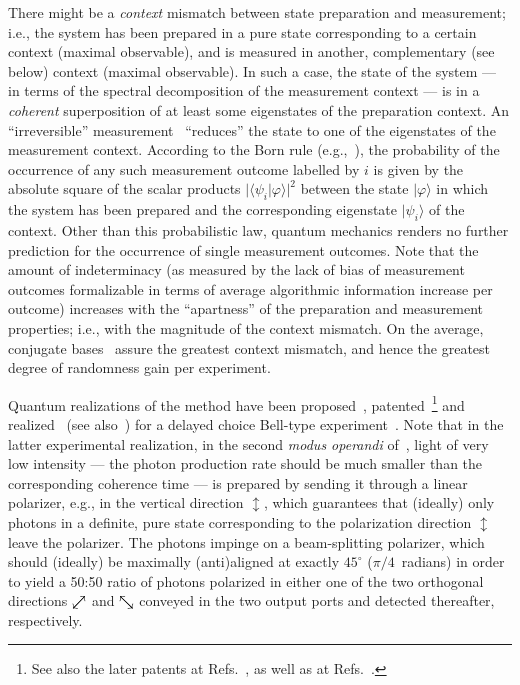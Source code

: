 \documentclass[%
 preprint,
 showpacs,
 showkeys,
 preprintnumbers,
 amsmath,amssymb,
 aps,
 prl,
  longbibliography,
 ]{revtex4-1}
\begin{document}
There might be a {\em context} mismatch between state preparation and measurement;
i.e.,  the system has been prepared in a pure state
corresponding to a certain context (maximal observable),
and is measured in another,  complementary (see below) context
(maximal observable).
In such a case, the state of the system --- in terms of the spectral decomposition
of the measurement context --- is in a {\em coherent} superposition of at least some eigenstates of the preparation context.
An ``irreversible'' measurement~\cite{hkwz,greenberger2} ``reduces'' the state to one of the eigenstates
of the measurement context.
According to the Born rule (e.g.,~\cite[Chapter~1]{mermin-07}),
the probability of the occurrence of any such measurement outcome labelled by $i$
is given by the absolute square of the scalar products
$\vert \langle \psi_i \vert \varphi \rangle \vert^2$
between the state $\vert \varphi \rangle$  in which the system has been prepared
and the corresponding eigenstate $\vert \psi_i \rangle$
of the context.
Other than this probabilistic law, quantum mechanics renders no further prediction for the occurrence of single measurement
outcomes.
Note that the amount of indeterminacy (as measured by the lack of bias of measurement outcomes
formalizable in terms of average algorithmic information increase per outcome)
increases with the ``apartness'' of the preparation and measurement properties;
i.e., with the magnitude of the context mismatch.
On the average, conjugate bases~\cite[p.~86]{wiesner} assure the greatest context mismatch,
and hence the greatest degree of randomness gain per experiment.


Quantum realizations of the method have been proposed~\cite{svozil-qct,rarity-94}, patented~\footnote{
See also the later patents at Refs.~\cite{dultz-98,dultz-99},
as well as at Refs.~\cite{Ribordy-04,Ribordy-06}.}
and realized~\cite[Fig.~1(b)]{zeilinger:qct} (see also~\cite{stefanov-2000})
for a delayed choice Bell-type experiment~\cite{zeilinger-epr-98}.
Note that in the latter experimental realization, in the second {\em modus operandi} of~\cite{zeilinger-epr-98},
light of very low intensity --- the photon production rate should be much smaller than the corresponding coherence time ---
is prepared by sending it through a linear polarizer, e.g., in the vertical direction $\updownarrow$,
which guarantees that (ideally) only photons in a definite,
pure state corresponding to the polarization direction $\updownarrow$ leave the polarizer.
The photons impinge on a beam-splitting polarizer,
which should (ideally) be maximally (anti)aligned at exactly $45^\circ$ ($\pi/4$~radians) in order to yield a 50:50 ratio of photons
polarized in either one of the two orthogonal directions $\swarrow\mkern-18mu\nearrow$
and $\searrow\mkern-18mu\nwarrow$ conveyed
in the two output ports and detected thereafter, respectively.
\end{document}
